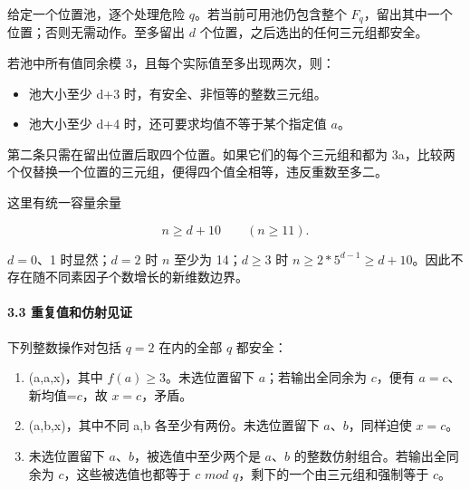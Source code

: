 \documentclass[11pt,a4paper]{article}
\newcommand{\tightlist}{\setlength{\itemsep}{0pt}\setlength{\parskip}{0pt}}
\theoremstyle{definition}
\numberwithin{equation}{section}
\begin{document}
{给定一个位置池，逐个处理危险} {\ensuremath{q}。若当前可用池仍包含整个} {\ensuremath{F_{q}}，留出其中一个位置；否则无需动作。至多留出} {\ensuremath{d}} {个位置，之后选出的任何三元组都安全。}

{若池中所有值同余模} {3，且每个实际值至多出现两次，则：}

\begin{itemize}
\tightlist
\item
  {池大小至少} {d+3} {时，有安全、非恒等的整数三元组。}
\item
  {池大小至少} {d+4} {时，还可要求均值不等于某个指定值} {\ensuremath{a}。}
\end{itemize}

{第二条只需在留出位置后取四个位置。如果它们的每个三元组和都为} {3a，比较两个仅替换一个位置的三元组，便得四个值全相等，违反重数至多二。}

{这里有统一容量余量}

\[
\boxed{n\ge d+10\qquad(n\ge11).}
\tag{C33.1}
\]

{\ensuremath{d=0}、1} {时显然；\ensuremath{d=2}} {时} {\ensuremath{n}} {至少为} {14；\ensuremath{d\ge 3}} {时} {\ensuremath{n\ge 2*5^{d-1}\ge d+10}。因此不存在随不同素因子个数增长的新维数边界。}

\paragraph*{\texorpdfstring{{3.3} {重复值和仿射见证}}{3.3 重复值和仿射见证}}\label{C33-h216}

{下列整数操作对包括} {\ensuremath{q=2}} {在内的全部} {\ensuremath{q}} {都安全：}

\begin{enumerate}
\def\labelenumi{\arabic{enumi}.}
\tightlist
\item
  {(a,a,x)，其中} {\ensuremath{f(a)\ge 3}。未选位置留下} {\ensuremath{a}；若输出全同余为} {\ensuremath{c}，便有} {\ensuremath{a=c}、新均值=\ensuremath{c}，故} {\ensuremath{x=c}，矛盾。}
\item
  {(a,b,x)，其中不同} {a,b} {各至少有两份。未选位置留下} {\ensuremath{a}、\ensuremath{b}，同样迫使} {\ensuremath{x=c}。}
\item
  {未选位置留下} {\ensuremath{a}、\ensuremath{b}，被选值中至少两个是} {\ensuremath{a}、\ensuremath{b}} {的整数仿射组合。若输出全同余为} {\ensuremath{c}，这些被选值也都等于} {\ensuremath{c}} {\ensuremath{mod}} {\ensuremath{q}，剩下的一个由三元组和强制等于} {\ensuremath{c}。}
\end{enumerate}
\end{document}
